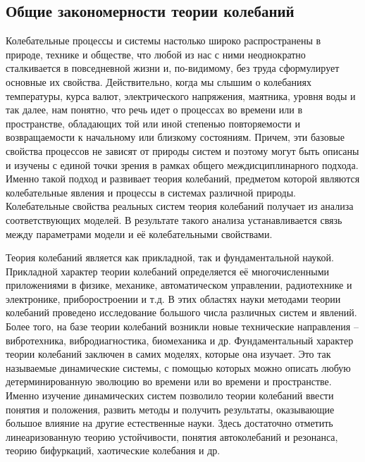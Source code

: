 \newcommand{\R}{\mathbb{R}}
\newcommand{\Z}{\mathbb{Z}}
\subsection{Общие закономерности теории колебаний} %

Колебательные процессы и системы настолько широко распространены в
природе, технике и обществе, что любой из нас с ними неоднократно
сталкивается в повседневной жизни и, по-видимому, без труда сформулирует
основные их свойства. Действительно, когда мы слышим о колебаниях
температуры, курса валют, электрического напряжения, маятника, уровня воды
и так далее, нам понятно, что речь идет о процессах во времени или в
пространстве, обладающих той или иной степенью повторяемости и
возвращаемости к начальному или близкому состояниям. Причем, эти базовые
свойства процессов не зависят от природы систем и поэтому могут быть
описаны и изучены с единой точки зрения в рамках общего
междисциплинарного подхода. Именно такой подход и развивает теория
колебаний, предметом которой являются колебательные явления и процессы в
системах различной природы. Колебательные свойства реальных систем теория
колебаний получает из анализа соответствующих моделей. В результате такого
анализа устанавливается связь между параметрами модели и её
колебательными свойствами.

Теория колебаний является как прикладной, так и фундаментальной
наукой. Прикладной характер теории колебаний определяется её
многочисленными приложениями в физике, механике, автоматическом
управлении, радиотехнике и электронике, приборостроении и т.д. В этих
областях науки методами теории колебаний проведено исследование большого
числа различных систем и явлений. Более того, на базе теории колебаний
возникли новые технические направления – вибротехника, вибродиагностика,
биомеханика и др. Фундаментальный характер теории колебаний заключен в
самих моделях, которые она изучает. Это так называемые динамические
системы, с помощью которых можно описать любую детерминированную
эволюцию во времени или во времени и пространстве. Именно изучение
динамических систем позволило теории колебаний ввести понятия и
положения, развить методы и получить результаты, оказывающие большое
влияние на другие естественные науки. Здесь достаточно отметить
линеаризованную теорию устойчивости, понятия автоколебаний и резонанса,
теорию бифуркаций, хаотические колебания и др.

